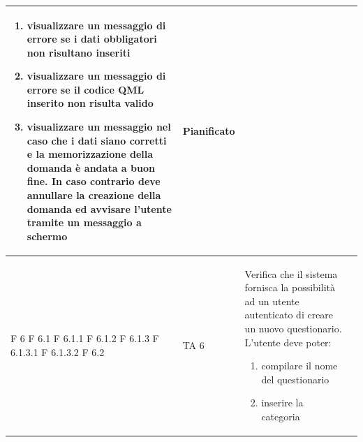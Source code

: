 \documentclass[a4paper,11pt]{article}
\begin{document}
\begin{longtable}{p{}p{}p{}p{}}
\begin{enumerate}
\item visualizzare un messaggio di errore se i dati obbligatori non risultano inseriti
\item visualizzare un messaggio di errore se il codice QML inserito non risulta valido
\item visualizzare un messaggio nel caso che i dati siano corretti e la memorizzazione della domanda è andata a buon fine. In caso contrario deve annullare la creazione della domanda ed avvisare l'utente tramite un messaggio a schermo
\end{enumerate} & Pianificato\\
\midrule
F 6 \newline F 6.1 \newline F 6.1.1 \newline F 6.1.2 \newline F 6.1.3 \newline F 6.1.3.1 \newline F 6.1.3.2 \newline F 6.2& TA 6& Verifica che il sistema fornisca la possibilità ad un utente autenticato di creare un nuovo questionario. \newline L'utente deve poter: 
\begin{enumerate}
\item compilare il nome del questionario
\item inserire la categoria

\end{enumerate}
\end{longtable}
\end{document}
